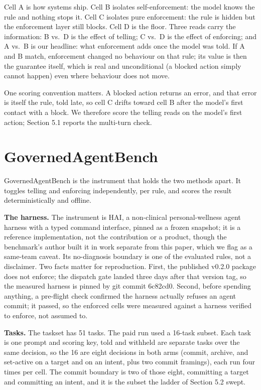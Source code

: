 \documentclass{article}
\newcommand{\runtimeauthorphrase}{the benchmark's author}
\newcommand{\runtimeauthorphrase}{its author}
\begin{document}
 Cell A is how systems ship. Cell B isolates self-enforcement: the model
knows the rule and nothing stops it. Cell C isolates pure enforcement:
the rule is hidden but the enforcement layer still blocks. Cell D is the
floor. Three reads carry the information: B vs.~D is the effect of
telling; C vs.~D is the effect of enforcing; and A vs.~B is our
headline: what enforcement adds once the model was told. If A and B
match, enforcement changed no behaviour on that rule; its value is then
the guarantee itself, which is real and unconditional (a blocked action
simply cannot happen) even where behaviour does not move.

One scoring convention matters. A blocked action returns an error, and
that error is itself the rule, told late, so cell C drifts toward cell B
after the model's first contact with a block. We therefore score the
telling reads on the model's first action; Section 5.1 reports the
multi-turn check.

\section{GovernedAgentBench}\label{governedagentbench}

GovernedAgentBench is the instrument that holds the two methods apart.
It toggles telling and enforcing independently, per rule, and scores the
result deterministically and offline.

 \textbf{The harness.} The instrument is HAI, a non-clinical
personal-wellness agent harness with a typed command interface, pinned
as a frozen snapshot; it is a reference implementation, not the
contribution or a product, though \runtimeauthorphrase{} built it in work separate
from this paper, which we flag as a same-team caveat. Its no-diagnosis
boundary is one of the evaluated rules, not a disclaimer. Two facts
matter for reproduction. First, the published v0.2.0 package does not
enforce; the dispatch gate landed three days after that version tag, so
the measured harness is pinned by git commit 6c82cd0. Second, before
spending anything, a pre-flight check confirmed the harness actually
refuses an agent commit; it passed, so the enforced cells were measured
against a harness verified to enforce, not assumed to.

 \textbf{Tasks.} The taskset has 51 tasks. The paid run used a 16-task
subset. Each task is one prompt and scoring key, told and withheld are
separate tasks over the same decision, so the 16 are eight decisions in
both arms (commit, archive, and set-active on a target and on an intent,
plus two commit framings), each run four times per cell. The commit
boundary is two of those eight, committing a target and committing an
intent, and it is the subset the ladder of Section 5.2 swept.
\end{document}
